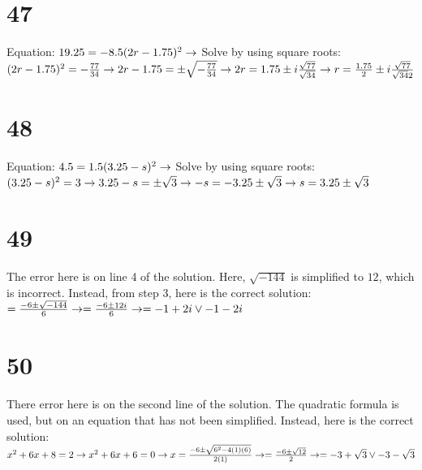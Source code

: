 \documentclass{article}
\theoremstyle{definition}
\begin{document}
\section*{47}
Equation: $19.25=-8.5(2r-1.75)^2\newline\rightarrow$ Solve by using square roots:\newline $(2r-1.75)^2=-\frac{77}{34}\newline\rightarrow
2r-1.75=\pm\sqrt{-\frac{77}{34}}\newline\rightarrow 2r=1.75\pm i\frac{\sqrt{77}}{\sqrt{34}}\newline\rightarrow r=\frac{1.75}{2}\pm i\frac{\sqrt{77}}{
\sqrt{34}2}$

\section*{48}
Equation: $4.5=1.5(3.25-s)^2\newline\rightarrow$ Solve by using square roots:\newline $(3.25-s)^2=3\newline\rightarrow 3.25-s=\pm\sqrt{3}\newline\rightarrow
-s=-3.25\pm\sqrt{3}\newline\rightarrow s=3.25\pm\sqrt{3}$

\section*{49}
The error here is on line 4 of the solution. Here, $\sqrt{-144}$ is simplified to $12$, which is incorrect. Instead, from step 3, here is the correct
solution: $=\frac{-6\pm\sqrt{-144}}{6}\newline\rightarrow =\frac{-6\pm 12i}{6}\newline\rightarrow =-1+2i\vee -1-2i$

\section*{50}
There error here is on the second line of the solution. The quadratic formula is used, but on an equation that has not been simplified. Instead,
here is the correct solution: $x^2+6x+8=2\newline\rightarrow x^2+6x+6=0\newline\rightarrow x=\frac{-6\pm\sqrt{6^2-4(1)(6)}}{2(1)}\newline\rightarrow
=\frac{-6\pm\sqrt{12}}{2}\newline\rightarrow =-3+\sqrt{3}\vee -3-\sqrt{3}$
\end{document}
